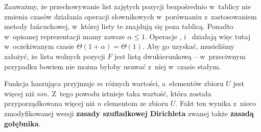 Zauważmy, że przechowywanie list zajętych pozycji bezpośrednio w~tablicy nie zmienia czasów działania operacji słownikowych w~porównaniu z~zastosowaniem metody łańcuchowej, w~której listy te znajdują się poza tablicą.
Ponadto w~opisanej reprezentacji mamy zawsze $\alpha\le1$.
Operacje ,  i~ działają więc tutaj w~oczekiwanym czasie $\Theta(1+\alpha)=\Theta(1)$.
Aby go uzyskać, musieliśmy założyć, że lista wolnych pozycji $F$ jest listą dwukierunkową -- w~przeciwnym przypadku bowiem nie można byłoby usuwać z~niej w~czasie stałym.

\exercise %
Funkcja haszująca przyjmuje $m$ różnych wartości, a~elementów zbioru $U$ jest więcej niż $nm$.
Z~tego powodu istnieje taka wartość, która została przyporządkowana więcej niż $n$ elementom ze zbioru $U$.
Fakt ten wynika z~nieco zmodyfikowanej wersji \textbf{zasady szufladkowej Dirichleta} \cite{pigeonholeprinciple} zwanej także \textbf{zasadą gołębnika}.
